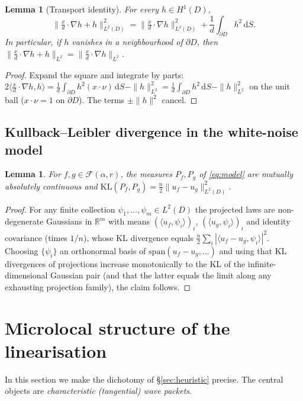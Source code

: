 \documentclass[11pt]{amsart}
\newtheorem{lemma}[theorem]{Lemma}
\newcommand{\R}{\mathbb{R}}
\newcommand{\1}{\mathbf{1}}
\newcommand{\F}{\mathcal{F}}
\newcommand{\dd}{\mathrm{d}}
\newcommand{\KL}{\mathrm{KL}}
\begin{document}
\begin{lemma}[Transport identity]\label{lem:transport-id}
For every $h\in H^1(D)$,
\[
\Big\|\tfrac{x}{d}\cdot\nabla h+h\Big\|_{L^2(D)}^2
=\Big\|\tfrac{x}{d}\cdot\nabla h\Big\|_{L^2(D)}^2
+\frac1d\int_{\partial D}h^2\,\dd S .
\]
In particular, if $h$ vanishes in a neighbourhood of $\partial D$, then
$\big\|\tfrac{x}{d}\cdot\nabla h+h\big\|_{L^2}=\big\|\tfrac{x}{d}\cdot\nabla h\big\|_{L^2}$.
\end{lemma}

\begin{proof}
Expand the square and integrate by parts:
$2\langle \tfrac{x}{d}\cdot\nabla h,h\rangle
=\frac1d\int_{\partial D}h^2(x\cdot\nu)\,\dd S-\|h\|_{L^2}^2
=\frac1d\int_{\partial D}h^2\,\dd S-\|h\|_{L^2}^2$
on the unit ball ($x\cdot\nu=1$ on $\partial D$). The terms $\pm\|h\|^2$
cancel.
\end{proof}

\subsection{Kullback--Leibler divergence in the white-noise model}

\begin{lemma}\label{lem:KL}
For $f,g\in\F(\alpha,r)$, the measures $P_f,P_g$ of \eqref{eq:model} are
mutually absolutely continuous and
$\KL(P_f,P_g)=\frac n2\|u_f-u_g\|_{L^2(D)}^2$.
\end{lemma}

\begin{proof}
For any finite collection $\psi_1,\dots,\psi_m\in L^2(D)$ the projected laws
are non-degenerate Gaussians in $\R^m$ with means
$(\langle u_f,\psi_i\rangle)_i$, $(\langle u_g,\psi_i\rangle)_i$ and identity
covariance (times $1/n$), whose KL divergence equals
$\frac n2\sum_i|\langle u_f-u_g,\psi_i\rangle|^2$. Choosing
$\{\psi_i\}$ an orthonormal basis of $\mathrm{span}(u_f-u_g,\dots)$ and using
that KL divergences of projections increase monotonically to the KL of the
infinite-dimensional Gaussian pair (and that the latter equals the limit
along any exhausting projection family), the claim follows.
\end{proof}

\section{Microlocal structure of the linearisation}\label{sec:micro}

In this section we make the dichotomy of \S\ref{sec:heuristic} precise. The
central objects are \emph{characteristic (tangential) wave packets}.
\end{document}

